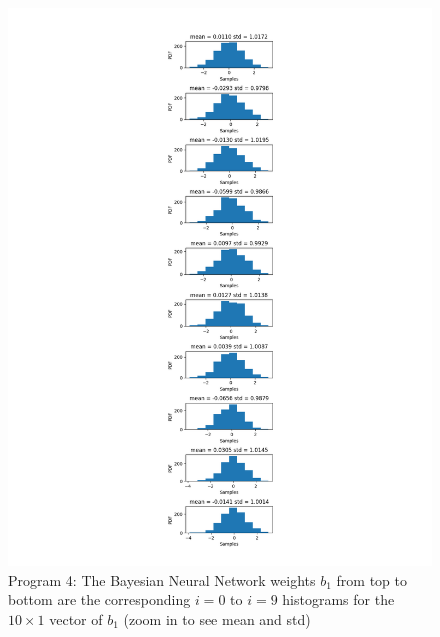 \documentclass[]{article}
\begin{document}
\begin{figure}[h]
	\begin{center}
		\includegraphics[width=\textwidth]{Graph/b1_nn.png}
		\caption{Program 4: The Bayesian Neural Network weights $b_1$ from top to bottom are the corresponding $i=0$ to $i=9$ histograms for the $10\times1$ vector of $b_1$ (zoom in to see mean and std)}
	\end{center}
\end{figure}
\end{document}
